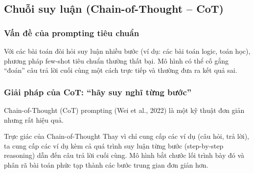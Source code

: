 \subsection{Chuỗi suy luận (Chain-of-Thought -- CoT)}
\label{ssec:chain_of_thought}

\subsubsection{Vấn đề của prompting tiêu chuẩn}
Với các bài toán đòi hỏi suy luận nhiều bước (ví dụ: các bài toán logic, toán học), phương pháp few-shot tiêu chuẩn thường thất bại. Mô hình có thể cố gắng “đoán” câu trả lời cuối cùng một cách trực tiếp và thường đưa ra kết quả sai.

\subsubsection{Giải pháp của CoT: “hãy suy nghĩ từng bước”}
Chain-of-Thought (CoT) prompting (Wei et al., 2022) \cite{wei2022chain} là một kỹ thuật đơn giản nhưng rất hiệu quả.
\begin{keyidea}{Trực giác của Chain-of-Thought}
Thay vì chỉ cung cấp các ví dụ (câu hỏi, trả lời), ta cung cấp các ví dụ kèm cả quá trình suy luận từng bước (step-by-step reasoning) dẫn đến câu trả lời cuối cùng. Mô hình bắt chước lối trình bày đó và phân rã bài toán phức tạp thành các bước trung gian đơn giản hơn.
\end{keyidea}

